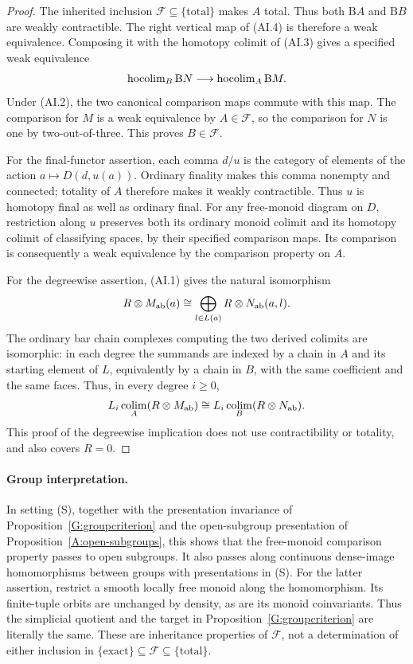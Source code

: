 \begin{proof}
The inherited inclusion $\mathcal F\subseteq\{\text{total}\}$
makes $A$ total. Thus both $\mathrm B A$ and $\mathrm B B$
are weakly contractible. The right vertical map of (AI.4)
is therefore a weak equivalence. Composing it with the
homotopy colimit of (AI.3) gives a specified weak equivalence
\[
 \operatorname{hocolim}_B\mathrm B N\longrightarrow
 \operatorname{hocolim}_A\mathrm B M.
\]
Under (AI.2), the two canonical comparison maps commute
with this map. The comparison for $M$ is a weak equivalence
by $A\in\mathcal F$, so the comparison for $N$ is one by
two-out-of-three. This proves $B\in\mathcal F$.

For the final-functor assertion, each comma $d/u$ is the
category of elements of the action $a\mapsto D(d,u(a))$.
Ordinary finality makes this comma nonempty and connected;
totality of $A$ therefore makes it weakly contractible.
Thus $u$ is homotopy final as well as ordinary final. For
any free-monoid diagram on $D$, restriction along $u$
preserves both its ordinary monoid colimit and its homotopy
colimit of classifying spaces, by their specified comparison
maps. Its comparison is consequently a weak equivalence by
the comparison property on $A$.

For the degreewise assertion, (AI.1) gives the natural
isomorphism
\[
 R\otimes M_{\mathrm{ab}}(a)
 \cong\bigoplus_{l\in L(a)} R\otimes N_{\mathrm{ab}}(a,l).
\]
The ordinary bar chain complexes computing the two derived
colimits are isomorphic: in each degree the summands are
indexed by a chain in $A$ and its starting element of $L$,
equivalently by a chain in $B$, with the same coefficient
and the same faces. Thus, in every degree $i\ge0$,
\[
 L_i\operatorname*{colim}_A(R\otimes M_{\mathrm{ab}})
 \cong L_i\operatorname*{colim}_B(R\otimes N_{\mathrm{ab}}).
\]
This proof of the degreewise implication does not use
contractibility or totality, and also covers $R=0$.
\end{proof}

\paragraph{Group interpretation.}
In setting (S), together with the presentation invariance of
Proposition~\ref{G:groupcriterion} and the open-subgroup
presentation of Proposition~\ref{A:open-subgroups}, this
shows that the free-monoid comparison property passes to
open subgroups. It also passes along continuous dense-image
homomorphisms between groups with presentations in (S).
For the latter assertion, restrict a smooth locally free
monoid along the homomorphism. Its finite-tuple orbits are
unchanged by density, as are its monoid coinvariants. Thus
the simplicial quotient and the target in
Proposition~\ref{G:groupcriterion} are literally the same.
These are inheritance properties of $\mathcal F$, not a
determination of either inclusion in
$\{\text{exact}\}\subseteq\mathcal F\subseteq\{\text{total}\}$.


